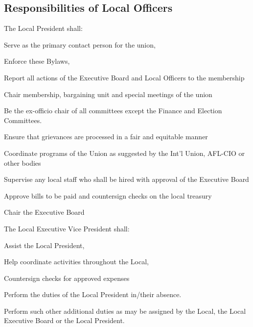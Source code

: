 \documentclass[12pt]{article}
\begin{document}
\subsection{Responsibilities of Local Officers}
\begin{letterlist}
\item The Local President shall:
  \begin{numberlist}
    \item Serve as the primary contact person for the union,
    \item Enforce these Bylaws,
    \item Report all actions of the Executive Board and Local Officers to the membership
    \item Chair membership, bargaining unit and special meetings of the union
    \item Be the ex-officio chair of all committees except the Finance and Election Committees.
    \item Ensure that grievances are processed in a fair and equitable manner
    \item Coordinate programs of the Union as suggested by the Int’l Union, AFL-CIO or other bodies
    \item Supervise any local staff who shall be hired with approval of the Executive Board
    \item Approve bills to be paid and countersign checks on the local treasury
    \item Chair the Executive Board
  \end{numberlist}

\item The Local Executive Vice President shall:
  \begin{numberlist}
    \item Assist the Local President,
    \item Help coordinate activities throughout the Local,
    \item Countersign checks for approved expenses
    \item Perform the duties of the Local President in/their absence.
    \item Perform such other additional duties as may be assigned by the Local, the Local Executive Board or the Local President.
  \end{numberlist}


\end{letterlist}
\end{document}
